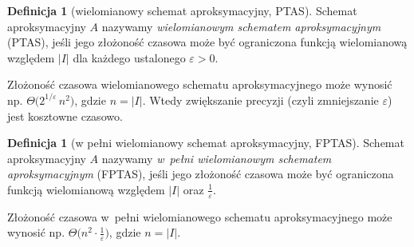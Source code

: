 \documentclass[11pt,a4paper]{article}
\theoremstyle{plain}
\theoremstyle{definition}
\newtheorem{definicja}[twierdzenie]{Definicja}
\newcommand{\eps}{\varepsilon}
\begin{document}
\begin{definicja}[wielomianowy schemat aproksymacyjny, PTAS]
Schemat aproksymacyjny $A$ nazywamy \emph{wielomianowym schematem aproksymacyjnym}
(PTAS), jeśli jego złożoność czasowa może być ograniczona funkcją wielomianową
względem $|I|$ dla każdego ustalonego $\eps>0$.
\end{definicja}
Złożoność czasowa wielomianowego schematu aproksymacyjnego może wynosić np.
$\Theta\!\bigl(2^{1/\eps}\,n^2\bigr)$, gdzie $n=|I|$. Wtedy zwiększanie precyzji
(czyli zmniejszanie $\eps$) jest kosztowne czasowo.

\begin{definicja}[w pełni wielomianowy schemat aproksymacyjny, FPTAS]
Schemat aproksymacyjny $A$ nazywamy \emph{w~pełni wielomianowym schematem
aproksymacyjnym} (FPTAS), jeśli jego złożoność czasowa może być ograniczona funkcją
wielomianową względem $|I|$ oraz $\tfrac1\eps$.
\end{definicja}
Złożoność czasowa w~pełni wielomianowego schematu aproksymacyjnego może wynosić np.
$\Theta\!\bigl(n^2\cdot\tfrac1\eps\bigr)$, gdzie $n=|I|$.
\end{document}
